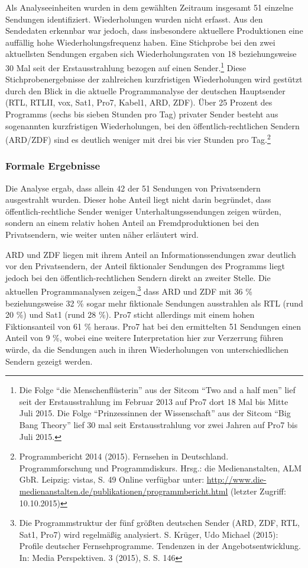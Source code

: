 Als Analyseeinheiten wurden in dem gewählten Zeitraum insgesamt 51
einzelne Sendungen identifiziert. Wiederholungen wurden nicht erfasst.
Aus den Sendedaten erkennbar war jedoch, dass insbesondere aktuellere
Produktionen eine auffällig hohe Wiederholungsfrequenz haben. Eine
Stichprobe bei den zwei aktuellsten Sendungen ergaben sich
Wiederholungsraten von 18 beziehungsweise 30 Mal seit der
Erstausstrahlung bezogen auf einen Sender.\footnote{Die Folge
  \enquote{die Menschenflüsterin} aus der Sitcom \enquote{Two and a half
  men} lief seit der Erstausstrahlung im Februar 2013 auf Pro7 dort 18
  Mal bis Mitte Juli 2015. Die Folge \enquote{Prinzessinnen der
  Wissenschaft} aus der Sitcom \enquote{Big Bang Theory} lief 30 mal
  seit Erstausstrahlung vor zwei Jahren auf Pro7 bis Juli 2015.} Diese
Stichprobenergebnisse der zahlreichen kurzfristigen Wiederholungen wird
gestützt durch den Blick in die aktuelle Programmanalyse der deutschen
Hauptsender (RTL, RTLII, vox, Sat1, Pro7, Kabel1, ARD, ZDF). Über 25
Prozent des Programms (sechs bis sieben Stunden pro Tag) privater Sender
besteht aus sogenannten kurzfristigen Wiederholungen, bei den
öffentlich-rechtlichen Sendern (ARD/ZDF) sind es deutlich weniger mit
drei bis vier Stunden pro Tag.\footnote{Programmbericht 2014 (2015).
  Fernsehen in Deutschland. Programmforschung und Programmdiskurs.
  Hrsg.: die Medienanstalten, ALM GbR. Leipzig: vistas, S. 49 Online
  verfügbar unter:
  \url{http://www.die-medienanstalten.de/publikationen/programmbericht.html}
  (letzter Zugriff: 10.10.2015)}

\subsubsection{Formale Ergebnisse}\label{formale-ergebnisse}

Die Analyse ergab, dass allein 42 der 51 Sendungen von Privatsendern
ausgestrahlt wurden. Dieser hohe Anteil liegt nicht darin begründet,
dass öffentlich-rechtliche Sender weniger Unterhaltungssendungen zeigen
würden, sondern an einem relativ hohen Anteil an Fremdproduktionen bei
den Privatsendern, wie weiter unten näher erläutert wird.

ARD und ZDF liegen mit ihrem Anteil an Informationssendungen zwar
deutlich vor den Privatsendern, der Anteil fiktionaler Sendungen des
Programms liegt jedoch bei den öffentlich-rechtlichen Sendern direkt an
zweiter Stelle. Die aktuellen Programmanalysen zeigen,\footnote{Die
  Programmstruktur der fünf größten deutschen Sender (ARD, ZDF, RTL,
  Sat1, Pro7) wird regelmäßig analysiert. S. Krüger, Udo Michael (2015):
  Profile deutscher Fernsehprogramme. Tendenzen in der
  Angebotsentwicklung. In: Media Perspektiven. 3 (2015), S. S. 146} dass
ARD und ZDF mit 36 \% beziehungsweise 32 \% sogar mehr fiktionale
Sendungen ausstrahlen als RTL (rund 20 \%) und Sat1 (rund 28 \%). Pro7
sticht allerdings mit einem hohen Fiktionsanteil von 61 \% heraus. Pro7
hat bei den ermittelten 51 Sendungen einen Anteil von 9 \%, wobei eine
weitere Interpretation hier zur Verzerrung führen würde, da die
Sendungen auch in ihren Wiederholungen von unterschiedlichen Sendern
gezeigt werden.

